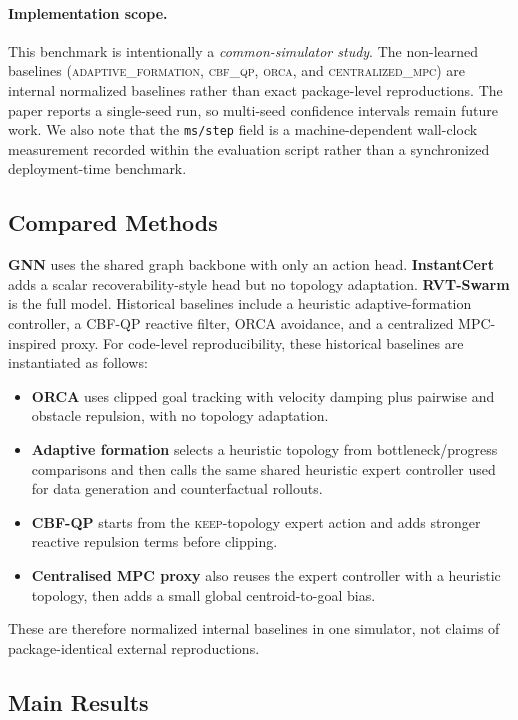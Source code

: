 \documentclass{ieeeaccess}
\begin{document}
\paragraph{Implementation scope.}
This benchmark is intentionally a \emph{common-simulator study}. The
non-learned baselines (\textsc{adaptive\_formation},
\textsc{cbf\_qp}, \textsc{orca}, and
\textsc{centralized\_mpc}) are internal normalized baselines rather
than exact package-level reproductions. The paper reports a single-seed
run, so multi-seed confidence intervals remain future work. We also
note that the \texttt{ms/step} field is a machine-dependent wall-clock
measurement recorded within the evaluation script rather than a
synchronized deployment-time benchmark.

\subsection{Compared Methods}
\textbf{GNN} uses the shared graph backbone with only an action
head. \textbf{InstantCert} adds a scalar recoverability-style head but
no topology adaptation. \textbf{RVT-Swarm} is the full model.
Historical baselines include a heuristic adaptive-formation controller,
a CBF-QP reactive filter, ORCA avoidance, and a centralized
MPC-inspired proxy. For code-level reproducibility, these historical
baselines are instantiated as follows:
\begin{itemize}
    \item \textbf{ORCA} uses clipped goal tracking with velocity damping plus pairwise and obstacle repulsion, with no topology adaptation.
    \item \textbf{Adaptive formation} selects a heuristic topology from bottleneck/progress comparisons and then calls the same shared heuristic expert controller used for data generation and counterfactual rollouts.
    \item \textbf{CBF-QP} starts from the \textsc{keep}-topology expert action and adds stronger reactive repulsion terms before clipping.
    \item \textbf{Centralised MPC proxy} also reuses the expert controller with a heuristic topology, then adds a small global centroid-to-goal bias.
\end{itemize}
These are therefore normalized internal baselines in one simulator, not claims of package-identical external reproductions.

\subsection{Main Results}
\label{sec:main_results}
\end{document}
